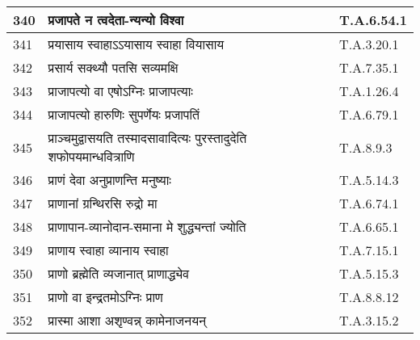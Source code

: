 \documentclass[17pt]{extarticle}
\begin{document}
\begin{longtable}{||p{0.4in}||p{4.9in}||p{0.9in}||}
    340 & प्रजापते न त्वदेता{-}न्यन्यो विश्वा & T.A.6.54.1       \\
    
    \hline
        
    341 & प्रयासाय स्वाहाऽऽयासाय स्वाहा वियासाय & T.A.3.20.1       \\
    
    \hline
        
    342 & प्रसार्य सक्थ्यौ पतसि सव्यमक्षि & T.A.7.35.1       \\
    
    \hline
        
    343 & प्राजापत्यो वा एषोऽग्निः प्राजापत्याः & T.A.1.26.4       \\
    
    \hline
        
    344 & प्राजापत्यो हारुणिः सुपर्णेयः प्रजापतिं & T.A.6.79.1       \\
    
    \hline
        
    345 & प्राञ्चमुद्वासयति तस्मादसावादित्यः पुरस्तादुदेति शफोपयमान्धवित्राणि & T.A.8.9.3       \\
    
    \hline
        
    346 & प्राणं देवा अनुप्राणन्ति मनुष्याः & T.A.5.14.3       \\
    
    \hline
        
    347 & प्राणानां ग्रन्थिरसि रुद्रो मा & T.A.6.74.1       \\
    
    \hline
        
    348 & प्राणापान{-}व्यानोदान{-}समाना मे शुद्ध्यन्तां ज्योति & T.A.6.65.1       \\
    
    \hline
        
    349 & प्राणाय स्वाहा व्यानाय स्वाहा & T.A.7.15.1       \\
    
    \hline
        
    350 & प्राणो ब्रह्मेति व्यजानात् प्राणाद्ध्येव & T.A.5.15.3       \\
    
    \hline
        
    351 & प्राणो वा इन्द्रतमोऽग्निः प्राण & T.A.8.8.12       \\
    
    \hline
        
    352 & प्रास्मा आशा अशृण्वन्न् कामेनाजनयन् & T.A.3.15.2       \\
    

\end{longtable}
\end{document}

